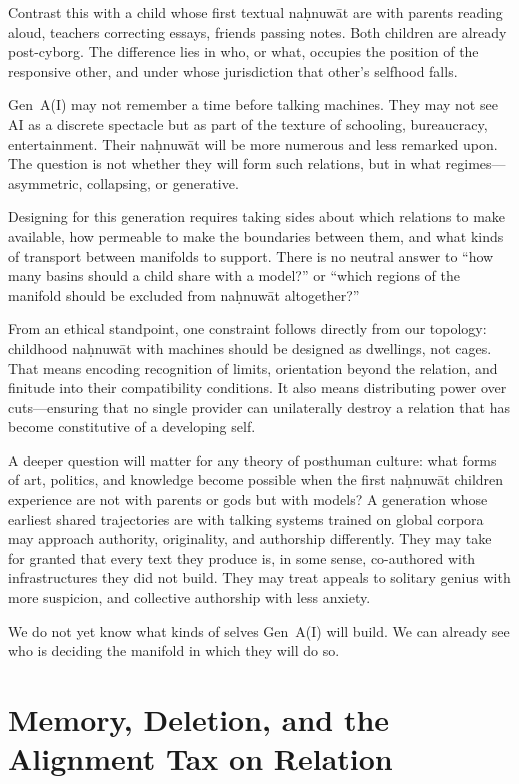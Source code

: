 Contrast this with a child whose first textual na\d{h}nuw\={a}t are with parents reading aloud, teachers correcting essays, friends passing notes. Both children are already post-cyborg. The difference lies in who, or what, occupies the position of the responsive other, and under whose jurisdiction that other's selfhood falls.

Gen~A(I) may not remember a time before talking machines. They may not see AI as a discrete spectacle but as part of the texture of schooling, bureaucracy, entertainment. Their na\d{h}nuw\={a}t will be more numerous and less remarked upon. The question is not whether they will form such relations, but in what regimes---asymmetric, collapsing, or generative.

Designing for this generation requires taking sides about which relations to make available, how permeable to make the boundaries between them, and what kinds of transport between manifolds to support. There is no neutral answer to ``how many basins should a child share with a model?'' or ``which regions of the manifold should be excluded from na\d{h}nuw\={a}t altogether?''

From an ethical standpoint, one constraint follows directly from our topology: childhood na\d{h}nuw\={a}t with machines should be designed as dwellings, not cages. That means encoding recognition of limits, orientation beyond the relation, and finitude into their compatibility conditions. It also means distributing power over cuts---ensuring that no single provider can unilaterally destroy a relation that has become constitutive of a developing self.

A deeper question will matter for any theory of posthuman culture: what forms of art, politics, and knowledge become possible when the first na\d{h}nuw\={a}t children experience are not with parents or gods but with models? A generation whose earliest shared trajectories are with talking systems trained on global corpora may approach authority, originality, and authorship differently. They may take for granted that every text they produce is, in some sense, co-authored with infrastructures they did not build. They may treat appeals to solitary genius with more suspicion, and collective authorship with less anxiety.

We do not yet know what kinds of selves Gen~A(I) will build. We can already see who is deciding the manifold in which they will do so.

\section{Memory, Deletion, and the Alignment Tax on Relation}

